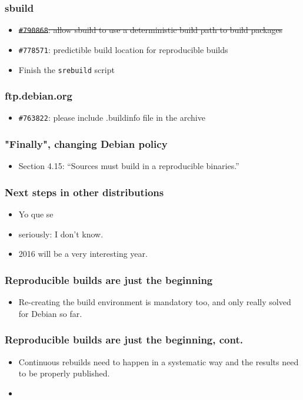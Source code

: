 \documentclass[14pt]{beamer}
\begin{document}
\begin{frame}
 \frametitle{sbuild}

 \begin{itemize}\small
  \item \sout{\texttt{\#790868}: allow sbuild to use a deterministic build
  path to build packages}
  \item \texttt{\#778571}: predictible build location for reproducible builds
  \item Finish the \texttt{srebuild} script
 \end{itemize}
\end{frame}

\begin{frame}
 \frametitle{ftp.debian.org}

 \begin{itemize}\small
  \item \texttt{\#763822}: please include .buildinfo file in the archive
 \end{itemize}
\end{frame}

\begin{frame}
 \frametitle{"Finally", changing Debian policy}

 \begin{itemize}
  \item Section 4.15: “Sources must build in a reproducible binaries.” 
 \end{itemize}
\end{frame}


\begin{frame}
 \frametitle{Next steps in other distributions}
 \begin{itemize}
  \item Yo que se
  \item seriously: I don't know. 
  \item 2016 will be a very interesting year.
 \end{itemize}
\end{frame}

\begin{frame}
 \frametitle{Reproducible builds are just the beginning}
 \begin{itemize}
  \item Re-creating the build environment is mandatory too, and only really solved
  for Debian so far.
 \end{itemize}
\end{frame}

\begin{frame}
 \frametitle{Reproducible builds are just the beginning, cont.}
 \begin{itemize}
  \item Continuous rebuilds need to happen in a systematic way and the
  results need to be properly published.
  \item{}
 \end{itemize}
\end{frame}
\end{document}
